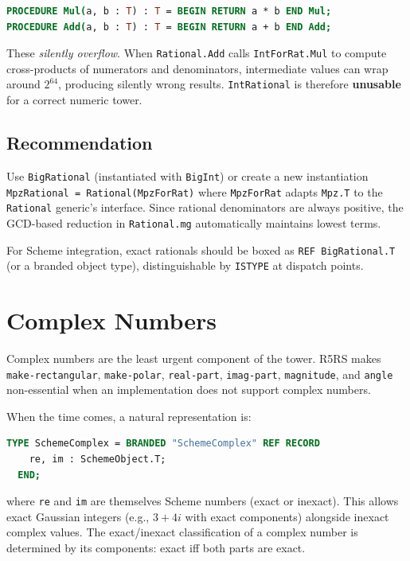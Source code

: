 \documentclass[12pt]{report}
\begin{document}
\begin{lstlisting}[language=Modula3]
PROCEDURE Mul(a, b : T) : T = BEGIN RETURN a * b END Mul;
PROCEDURE Add(a, b : T) : T = BEGIN RETURN a + b END Add;
\end{lstlisting}

\noindent These \emph{silently overflow}.  When {\tt Rational.Add}
calls {\tt IntForRat.Mul} to compute cross-products of numerators
and denominators, intermediate values can wrap around $2^{64}$,
producing silently wrong results.  {\tt IntRational} is therefore
\textbf{unusable} for a correct numeric tower.

\subsection{Recommendation}

Use {\tt BigRational} (instantiated with {\tt BigInt}) or create a
new instantiation {\tt MpzRational = Rational(MpzForRat)} where
{\tt MpzForRat} adapts {\tt Mpz.T} to the {\tt Rational} generic's
interface.  Since rational denominators are always positive, the
GCD-based reduction in {\tt Rational.mg} automatically maintains
lowest terms.

For Scheme integration, exact rationals should be boxed as {\tt REF
BigRational.T} (or a branded object type), distinguishable by
{\tt ISTYPE} at dispatch points.

\section{Complex Numbers}

Complex numbers are the least urgent component of the tower.
R5RS makes {\tt make-rectangular}, {\tt make-polar},
{\tt real-part}, {\tt imag-part}, {\tt magnitude}, and {\tt angle}
non-essential when an implementation does not support complex numbers.

When the time comes, a natural representation is:

\begin{lstlisting}[language=Modula3]
TYPE SchemeComplex = BRANDED "SchemeComplex" REF RECORD
    re, im : SchemeObject.T;
  END;
\end{lstlisting}

\noindent where {\tt re} and {\tt im} are themselves Scheme numbers
(exact or inexact).  This allows exact Gaussian integers
(e.g., $3+4i$ with exact components) alongside inexact complex
values.  The exact/inexact classification of a complex number is
determined by its components: exact iff both parts are exact.
\end{document}
